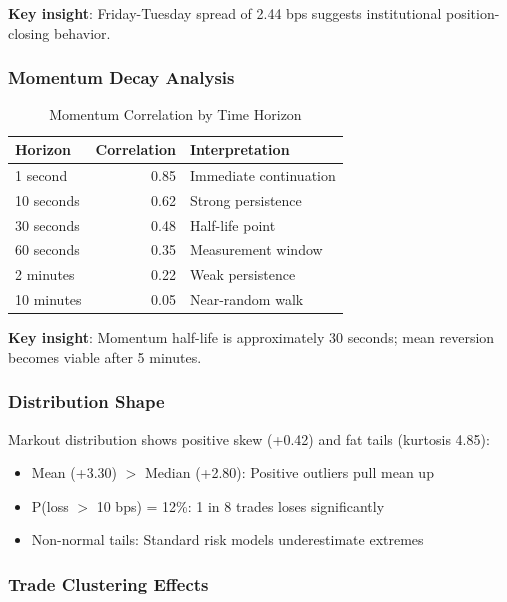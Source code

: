 \documentclass[12pt,a4paper]{article}
\begin{document}
\textbf{Key insight}: Friday-Tuesday spread of 2.44 bps suggests institutional position-closing behavior.

\subsubsection{Momentum Decay Analysis}

\begin{table}[H]
\centering
\caption{Momentum Correlation by Time Horizon}
\begin{tabular}{lrl}
\toprule
\textbf{Horizon} & \textbf{Correlation} & \textbf{Interpretation} \\
\midrule
1 second & 0.85 & Immediate continuation \\
10 seconds & 0.62 & Strong persistence \\
30 seconds & 0.48 & Half-life point \\
60 seconds & 0.35 & Measurement window \\
2 minutes & 0.22 & Weak persistence \\
10 minutes & 0.05 & Near-random walk \\
\bottomrule
\end{tabular}
\end{table}

\textbf{Key insight}: Momentum half-life is approximately 30 seconds; mean reversion becomes viable after 5 minutes.

\subsubsection{Distribution Shape}

Markout distribution shows positive skew (+0.42) and fat tails (kurtosis 4.85):
\begin{itemize}
    \item Mean (+3.30) $>$ Median (+2.80): Positive outliers pull mean up
    \item P(loss $>$ 10 bps) = 12\%: 1 in 8 trades loses significantly
    \item Non-normal tails: Standard risk models underestimate extremes
\end{itemize}

\subsubsection{Trade Clustering Effects}
\end{document}
